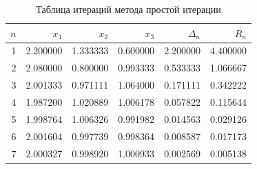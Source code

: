 \begin{table}[H]
\centering
\caption{Таблица итераций метода простой итерации}
\small
\begin{tabular}{rrrrrr}
\toprule
$n$ & $x_1$ & $x_2$ & $x_3$ & $\Delta_n$ & $R_n$ \\
\midrule
1 & 2.200000 & 1.333333 & 0.600000 & 2.200000 & 4.400000 \\
2 & 2.080000 & 0.800000 & 0.993333 & 0.533333 & 1.066667 \\
3 & 2.001333 & 0.971111 & 1.064000 & 0.171111 & 0.342222 \\
4 & 1.987200 & 1.020889 & 1.006178 & 0.057822 & 0.115644 \\
5 & 1.998764 & 1.006326 & 0.991982 & 0.014563 & 0.029126 \\
6 & 2.001604 & 0.997739 & 0.998364 & 0.008587 & 0.017173 \\
7 & 2.000327 & 0.998920 & 1.000933 & 0.002569 & 0.005138 \\
\bottomrule
\end{tabular}
\normalsize
\end{table}
